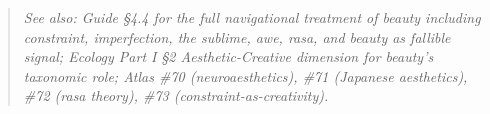 \begin{quote}
\itshape
\textit{See also: Guide §4.4 for the full navigational treatment of beauty including constraint, imperfection, the sublime, awe, rasa, and beauty as fallible signal; Ecology Part I §2 Aesthetic-Creative dimension for beauty's taxonomic role; Atlas \#70 (neuroaesthetics), \#71 (Japanese aesthetics), \#72 (rasa theory), \#73 (constraint-as-creativity).}
\end{quote}


\bigskip\noindent\makebox[\textwidth]{\color{rulegray}\rule{5cm}{0.3pt}}\bigskip

